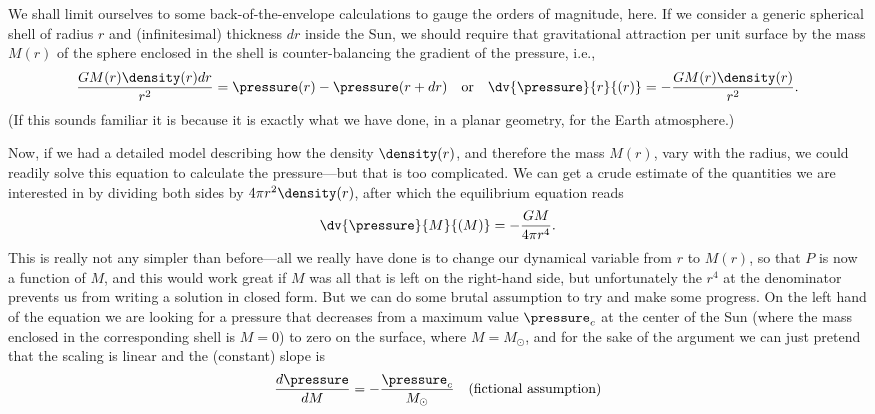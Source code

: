 \begin{marginfigure}
  
  \caption{Basic sketch for setting up the hydrostatic equilibrium in a star.}
\end{marginfigure}

We shall limit ourselves to some back-of-the-envelope calculations to gauge the orders
of magnitude, here. If we consider a generic spherical shell of radius $r$ and
(infinitesimal) thickness $dr$ inside the Sun, we should require that gravitational
attraction per unit surface by the mass $M(r)$ of the sphere enclosed in the shell
is counter-balancing the gradient of the pressure, i.e.,
\begin{align}\label{eq:hydro_equilibrium}
  \frac{G M(r)\density(r) dr}{r^2} = \pressure(r) - \pressure(r + dr)
  \quad\text{or}\quad
  \dv{\pressure}{r}{(r)} = -\frac{G M(r) \density(r)}{r^2}.
\end{align}
(If this sounds familiar it is because it is exactly what we have done, in a planar
geometry, for the Earth atmosphere.)

Now, if we had a detailed model describing how the density $\density(r)$,
and therefore the mass $M(r)$, vary with the radius, we could readily solve this
equation to calculate the pressure---but that is too complicated. We can get a
crude estimate of the quantities we are interested in by dividing both sides
by $4\pi r^2 \density(r)$, after which the equilibrium equation reads
\begin{align}
  \dv{\pressure}{M}{(M)} = -\frac{G M}{4\pi r^4}.
\end{align}
This is really not any simpler than before---all we really have done is to change
our dynamical variable from $r$ to $M(r)$, so that $P$ is now a function of
$M$, and this would work great if $M$ was all that is left on the right-hand side,
but unfortunately the $r^4$ at the denominator prevents us from writing a solution
in closed form. But we can do some brutal assumption to try and make some progress.
On the left hand of the equation we are looking for a pressure that decreases from a
maximum value $\pressure_c$ at the center of the Sun (where the mass enclosed in
the corresponding shell is $M = 0$) to zero on the surface, where $M = M_\odot$, and
for the sake of the argument we can just pretend that the scaling is linear and the
(constant) slope is
\begin{align*}
	\frac{d\pressure}{dM} = -\frac{\pressure_c}{M_\odot} \quad
	\text{(fictional assumption)}
\end{align*}

